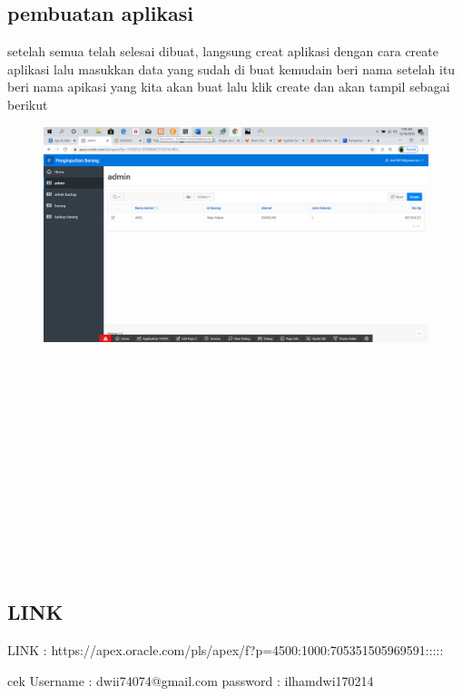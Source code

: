 \documentclass{article}
\begin{document}
\subsection{pembuatan aplikasi}
\par setelah semua telah selesai dibuat, langsung creat aplikasi dengan cara create aplikasi lalu masukkan data yang sudah di buat kemudain beri nama setelah itu beri nama apikasi yang kita akan buat lalu klik create dan akan tampil sebagai berikut
\begin{figure}[h]
\includegraphics[scale=0.3]{img/16.PNG}
\end{figure}
\\
\\
\\
\\
\\
\\
\\
\\
\\
\\
\\
\\

\subsection{LINK}
\par LINK :
https://apex.oracle.com/pls/apex/f?p=4500:1000:705351505969591:::::

cek
Username :
dwii74074@gmail.com
password :
ilhamdwi170214
\end{document}
